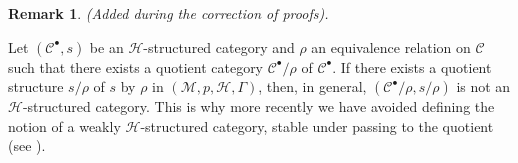 \documentclass[a4paper,fleqn]{article}
\theoremstyle{plain}
\theoremstyle{definition}
\newtheorem*{remark}{Remark}
\newcommand{\CC}{\mathcal{C}}
\newcommand{\HH}{\mathcal{H}}
\newcommand{\MM}{\mathcal{M}}
\newcommand{\smallbullet}{\bullet}
\begin{document}
\begin{remark}
  \emph{(Added during the correction of proofs).}

  Let $(\CC^\smallbullet,s)$ be an $\HH$-structured category and $\rho$ an equivalence relation on $\CC$ such that there exists a quotient category $\CC^\smallbullet/\rho$ of $\CC^\smallbullet$.
  If there exists a quotient structure \cite{3e} $s/\rho$ of $s$ by $\rho$ in $(\MM,p,\HH,\Gamma)$, then, in general, $(\CC^\smallbullet/\rho,s/\rho)$ is not an $\HH$-structured category.
  This is why more recently we have avoided defining the notion of a weakly $\HH$-structured category, stable under passing to the quotient (see \cite{coll66}).
\end{remark}






\begingroup
\let\clearpage\relax
  \printbibliography[keyword={orig},heading=bibintoc,title=Bibliography]
  \printbibliography[keyword={coll},title={Citations to the collected works}]
  \printbibliography[keyword={comm},title={Citations from comments in the collected works}]
\endgroup
\end{document}
